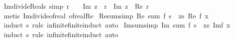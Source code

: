 \begin{isabellebody}
\endisatagproof
{\isafoldproof}%
%
\isadelimproof
\isanewline
%
\endisadelimproof
\isanewline
{}\isamarkupfalse%
\ Im{\isacharunderscore}{\kern0pt}divide{\isacharunderscore}{\kern0pt}Reals\ {\isacharbrackleft}{\kern0pt}simp{\isacharbrackright}{\kern0pt}{\isacharcolon}{\kern0pt}\ {\isachardoublequoteopen}r\ {\isasymin}\ {\isasymreal}\ {\isasymLongrightarrow}\ Im\ {\isacharparenleft}{\kern0pt}z\ {\isacharslash}{\kern0pt}\ r{\isacharparenright}{\kern0pt}\ {\isacharequal}{\kern0pt}\ Im\ z\ {\isacharslash}{\kern0pt}\ Re\ r{\isachardoublequoteclose}\isanewline
%
\isadelimproof
\ \ %
\endisadelimproof
%
\isatagproof
{}\isamarkupfalse%
\ {\isacharparenleft}{\kern0pt}metis\ Im{\isacharunderscore}{\kern0pt}divide{\isacharunderscore}{\kern0pt}of{\isacharunderscore}{\kern0pt}real\ of{\isacharunderscore}{\kern0pt}real{\isacharunderscore}{\kern0pt}Re{\isacharparenright}{\kern0pt}%
\endisatagproof
{\isafoldproof}%
%
\isadelimproof
\isanewline
%
\endisadelimproof
\isanewline
{}\isamarkupfalse%
\ Re{\isacharunderscore}{\kern0pt}sum{\isacharbrackleft}{\kern0pt}simp{\isacharbrackright}{\kern0pt}{\isacharcolon}{\kern0pt}\ {\isachardoublequoteopen}Re\ {\isacharparenleft}{\kern0pt}sum\ f\ s{\isacharparenright}{\kern0pt}\ {\isacharequal}{\kern0pt}\ {\isacharparenleft}{\kern0pt}{\isasymSum}x{\isasymin}s{\isachardot}{\kern0pt}\ Re\ {\isacharparenleft}{\kern0pt}f\ x{\isacharparenright}{\kern0pt}{\isacharparenright}{\kern0pt}{\isachardoublequoteclose}\isanewline
%
\isadelimproof
\ \ %
\endisadelimproof
%
\isatagproof
{}\isamarkupfalse%
\ {\isacharparenleft}{\kern0pt}induct\ s\ rule{\isacharcolon}{\kern0pt}\ infinite{\isacharunderscore}{\kern0pt}finite{\isacharunderscore}{\kern0pt}induct{\isacharparenright}{\kern0pt}\ auto%
\endisatagproof
{\isafoldproof}%
%
\isadelimproof
\isanewline
%
\endisadelimproof
\isanewline
{}\isamarkupfalse%
\ Im{\isacharunderscore}{\kern0pt}sum{\isacharbrackleft}{\kern0pt}simp{\isacharbrackright}{\kern0pt}{\isacharcolon}{\kern0pt}\ {\isachardoublequoteopen}Im\ {\isacharparenleft}{\kern0pt}sum\ f\ s{\isacharparenright}{\kern0pt}\ {\isacharequal}{\kern0pt}\ {\isacharparenleft}{\kern0pt}{\isasymSum}x{\isasymin}s{\isachardot}{\kern0pt}\ Im{\isacharparenleft}{\kern0pt}f\ x{\isacharparenright}{\kern0pt}{\isacharparenright}{\kern0pt}{\isachardoublequoteclose}\isanewline
%
\isadelimproof
\ \ %
\endisadelimproof
%
\isatagproof
{}\isamarkupfalse%
\ {\isacharparenleft}{\kern0pt}induct\ s\ rule{\isacharcolon}{\kern0pt}\ infinite{\isacharunderscore}{\kern0pt}finite{\isacharunderscore}{\kern0pt}induct{\isacharparenright}{\kern0pt}\ auto%

\end{isabellebody}
